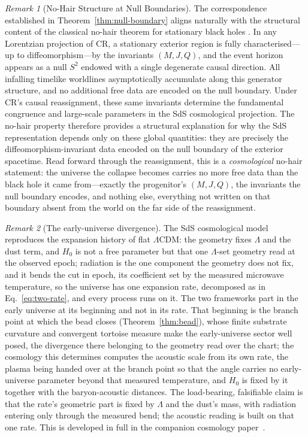 \documentclass[11pt,a4paper]{article}
\theoremstyle{plain}
\theoremstyle{definition}
\theoremstyle{remark}
\newtheorem{remark}{Remark}
\begin{document}
\begin{remark}[No-Hair Structure at Null Boundaries]
The correspondence established in Theorem~\ref{thm:null-boundary} aligns naturally with the structural content of the classical no-hair theorem for stationary black holes \cite{Israel1967,Carter1971,Robinson1975}. In any Lorentzian projection of CR, a stationary exterior region is fully characterised---up to diffeomorphism---by the invariants $(M,J,Q)$, and the event horizon appears as a null $S^{2}$ endowed with a single degenerate causal direction. All infalling timelike worldlines asymptotically accumulate along this generator structure, and no additional free data are encoded on the null boundary. Under CR's causal reassignment, these same invariants determine the fundamental congruence and large-scale parameters in the SdS cosmological projection. The no-hair property therefore provides a structural explanation for why the SdS representation depends only on these global quantities: they are precisely the diffeomorphism-invariant data encoded on the null boundary of the exterior spacetime. Read forward through the reassignment, this is a \emph{cosmological} no-hair statement: the universe the collapse becomes carries no more free data than the black hole it came from---exactly the progenitor's $(M,J,Q)$, the invariants the null boundary encodes, and nothing else, everything not written on that boundary absent from the world on the far side of the reassignment.
\end{remark}

\begin{remark}[The early-universe divergence]
The SdS cosmological model reproduces the expansion history of flat $\Lambda$CDM: the geometry fixes $\Lambda$ and the dust term, and $H_0$ is not a free parameter but that one $\Lambda$-set geometry read at the observed epoch; radiation is the one component the geometry does not fix, and it bends the cut in epoch, its coefficient set by the measured microwave temperature, so the universe has one expansion rate, decomposed as in Eq.~\eqref{eq:two-rate}, and every process runs on it. The two frameworks part in the early universe at its beginning and not in its rate. That beginning is the branch point at which the bead closes (Theorem~\ref{thm:bead}), whose finite substrate curvature and convergent tortoise measure make the early-universe sector well posed, the divergence there belonging to the geometry read over the chart; the cosmology this determines computes the acoustic scale from its own rate, the plasma being handed over at the branch point so that the angle carries no early-universe parameter beyond that measured temperature, and $H_0$ is fixed by it together with the baryon-acoustic distances. The load-bearing, falsifiable claim is that the rate's geometric part is fixed by $\Lambda$ and the dust's mass, with radiation entering only through the measured bend; the acoustic reading is built on that one rate. This is developed in full in the companion cosmology paper~\cite{JanzenCRcosmology}.
\end{remark}
\end{document}
